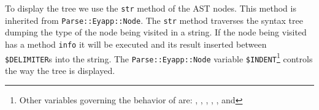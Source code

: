 To display
the tree we use the \verb|str| method
of the AST nodes. This method is inherited from \verb|Parse::Eyapp::Node|. 
The \verb|str| method traverses the syntax tree dumping the type
of the node being visited in a string. If the node being visited
has a method \verb|info| it will
be executed and its result inserted between \verb|$DELIMITER|s
into the string. The \verb|Parse::Eyapp::Node| variable 
\verb|$INDENT|\footnote{Other 
variables governing the behavior of  are:
\code{\@PREFIXES},
,
,
,
,
and
}
controls the way the tree is displayed. 

